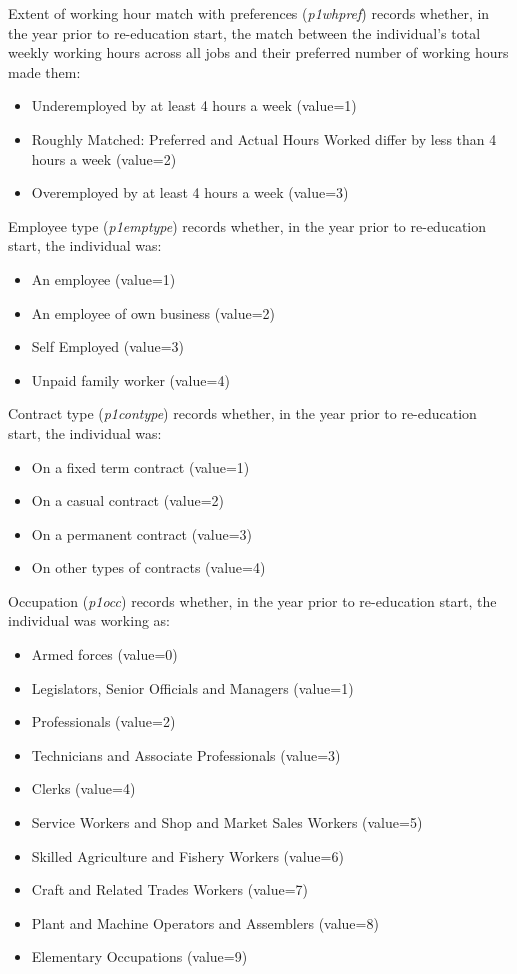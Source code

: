 \documentclass[12pt, a4paper]{article}
\begin{document}
Extent of working hour match with preferences (\textit{p1\textunderscore{}whpref}) records whether, in the year prior to re-education start, the match between the individual’s total weekly working hours across all jobs and their preferred number of working hours made them:
\begin{itemize}
  \item Underemployed by at least 4 hours a week (value=1)
  \item Roughly Matched: Preferred and Actual Hours Worked differ by less than 4 hours a week (value=2)
  \item Overemployed by at least 4 hours a week (value=3)
\end{itemize}  

Employee type (\textit{p1\textunderscore{}emptype}) records whether, in the year prior to re-education start, the individual was:
\begin{itemize}
  \item An employee (value=1)
  \item An employee of own business (value=2)
  \item Self Employed (value=3)
  \item Unpaid family worker (value=4)
\end{itemize}  

Contract type (\textit{p1\textunderscore{}contype}) records whether, in the year prior to re-education start, the individual was:
\begin{itemize}
  \item On a fixed term contract (value=1)
  \item On a casual contract (value=2)
  \item On a permanent contract (value=3)
  \item On other types of contracts  (value=4)
\end{itemize}  

Occupation (\textit{p1\textunderscore{}occ}) records whether, in the year prior to re-education start, the individual was working as:
\begin{itemize}
  \item Armed forces (value=0)
  \item Legislators, Senior Officials and Managers (value=1)
  \item Professionals (value=2)
  \item Technicians and Associate Professionals (value=3)
  \item Clerks (value=4)
  \item Service Workers and Shop and Market Sales Workers (value=5)
  \item Skilled Agriculture and Fishery Workers (value=6)
  \item Craft and Related Trades Workers (value=7)
  \item Plant and Machine Operators and Assemblers (value=8)
  \item Elementary Occupations (value=9)
\end{itemize}  
\end{document}
